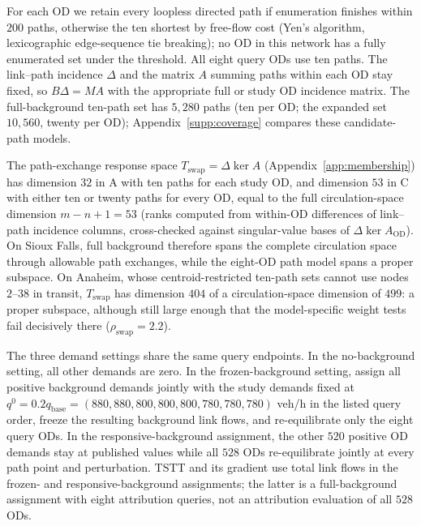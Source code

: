 For each OD we retain every loopless directed path if enumeration finishes
within $200$ paths, otherwise the ten shortest by free-flow cost (Yen's
algorithm, lexicographic edge-sequence tie breaking); no OD in this
network has a fully enumerated set under the threshold. All eight query
ODs use ten paths. The link--path incidence $\Delta$ and the matrix $A$
summing paths within each OD stay fixed, so $B\Delta=MA$ with the
appropriate full or study OD incidence matrix. The full-background
ten-path set has $5{,}280$ paths (ten per OD; the expanded set
$10{,}560$, twenty per OD); Appendix~\ref{supp:coverage} compares these
candidate-path models.

The path-exchange response space $T_{\mathrm{swap}}=\Delta\ker A$
(Appendix~\ref{app:membership}) has dimension $32$ in A with ten
paths for each study OD, and dimension $53$ in C with either ten or
twenty paths for every OD, equal to the full circulation-space
dimension $m-n+1=53$ (ranks computed from within-OD differences of
link--path incidence columns, cross-checked against singular-value
bases of $\Delta\ker A_{\mathrm{OD}}$). On Sioux Falls, full background
therefore spans the complete circulation space through allowable path
exchanges, while the eight-OD path model spans a proper subspace. On Anaheim, whose
centroid-restricted ten-path sets cannot use nodes $2$--$38$ in
transit, $T_{\mathrm{swap}}$ has dimension $404$ of a circulation-space
dimension of $499$: a proper subspace, although still large enough
that the model-specific weight tests fail decisively there
($\rho_{\mathrm{swap}}=2.2$).

The three demand settings share the same query endpoints. In the
no-background setting, all other demands are zero. In the
frozen-background setting, assign all positive
background demands jointly with the study demands fixed at
$q^0=0.2q_{\mathrm{base}}=(880,880,800,800,800,780,780,780)$ veh/h in
the listed query order, freeze the resulting background link flows, and
re-equilibrate only the eight query ODs. In the responsive-background assignment, the other $520$
positive OD demands stay at published values while all $528$ ODs
re-equilibrate jointly at every path point and perturbation. TSTT and
its gradient use total link flows in the frozen- and responsive-background assignments; the latter is a
full-background assignment with eight attribution queries, not an
attribution evaluation of all $528$ ODs.

